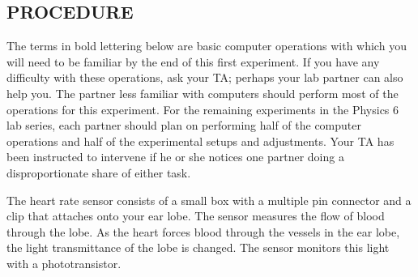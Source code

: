 \subsection*{PROCEDURE}

The terms in bold lettering below are basic computer operations with which you will need to be familiar by the end of this first experiment.  If you have any difficulty with these operations, ask your TA; perhaps your lab partner can also help you.  The partner less familiar with computers should perform most of the operations for this experiment.  For the remaining experiments in the Physics 6 lab series, each partner should plan on performing half of the computer operations and half of the experimental setups and adjustments.  Your TA has been instructed to intervene if he or she notices one partner doing a disproportionate share of either task.

The heart rate sensor consists of a small box with a multiple pin connector and a clip that attaches onto your ear lobe.  The sensor measures the flow of blood through the lobe.  As the heart forces blood through the vessels in the ear lobe, the light transmittance of the lobe is changed.  The sensor monitors this light with a phototransistor.

